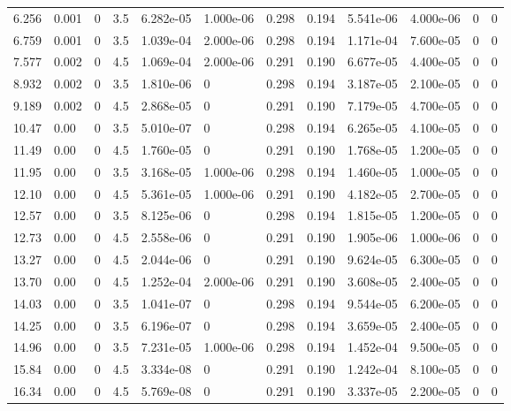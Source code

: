 \documentclass[preview]{standalone}
\begin{document}
{{\begin{tabular}{L{1.2cm}C{1.2cm} C{0.3cm}C{0.5cm} C{1.4cm}C{1.4cm} C{1.4cm}C{1.4cm} C{1.6cm}C{1.6cm} C{1.6cm}C{1.6cm}}
  6.256  &  0.001  & 0     & 3.5 &  6.282e-05  & 1.000e-06  &  0.298&   0.194& 5.541e-06 & 4.000e-06   &  0 & 0  \\ 
  6.759  &  0.001  & 0     & 3.5 &  1.039e-04  & 2.000e-06  &  0.298&   0.194& 1.171e-04 & 7.600e-05   &  0 & 0  \\ 
  7.577  &  0.002  & 0     & 4.5 &  1.069e-04  & 2.000e-06  &  0.291&   0.190& 6.677e-05 & 4.400e-05   &  0 & 0  \\ 
  8.932  &  0.002  & 0     & 3.5 &  1.810e-06  & 0  &  0.298&   0.194& 3.187e-05 & 2.100e-05   &  0 & 0  \\ 
  9.189  &  0.002  & 0     & 4.5 &  2.868e-05  & 0  &  0.291&   0.190& 7.179e-05 & 4.700e-05   &  0 & 0  \\ 
  10.47  &  0.00  & 0     & 3.5 &  5.010e-07  & 0  &  0.298&   0.194& 6.265e-05 & 4.100e-05   &  0 & 0  \\ 
  11.49  &  0.00  & 0     & 4.5 &  1.760e-05  & 0  &  0.291&   0.190& 1.768e-05 & 1.200e-05   &  0 & 0  \\ 
  11.95  &  0.00  & 0     & 3.5 &  3.168e-05  & 1.000e-06  &  0.298&   0.194& 1.460e-05 & 1.000e-05   &  0 & 0  \\ 
  12.10  &  0.00  & 0     & 4.5 &  5.361e-05  & 1.000e-06  &  0.291&   0.190& 4.182e-05 & 2.700e-05   &  0 & 0  \\ 
  12.57  &  0.00  & 0     & 3.5 &  8.125e-06  & 0  &  0.298&   0.194& 1.815e-05 & 1.200e-05   &  0 & 0  \\ 
  12.73  &  0.00  & 0     & 4.5 &  2.558e-06  & 0  &  0.291&   0.190& 1.905e-06 & 1.000e-06   &  0 & 0  \\ 
  13.27  &  0.00  & 0     & 4.5 &  2.044e-06  & 0  &  0.291&   0.190& 9.624e-05 & 6.300e-05   &  0 & 0  \\ 
  13.70  &  0.00  & 0     & 4.5 &  1.252e-04  & 2.000e-06  &  0.291&   0.190& 3.608e-05 & 2.400e-05   &  0 & 0  \\ 
  14.03  &  0.00  & 0     & 3.5 &  1.041e-07  & 0  &  0.298&   0.194& 9.544e-05 & 6.200e-05   &  0 & 0  \\ 
  14.25  &  0.00  & 0     & 3.5 &  6.196e-07  & 0  &  0.298&   0.194& 3.659e-05 & 2.400e-05   &  0 & 0  \\ 
  14.96  &  0.00  & 0     & 3.5 &  7.231e-05  & 1.000e-06  &  0.298&   0.194& 1.452e-04 & 9.500e-05   &  0 & 0  \\ 
  15.84  &  0.00  & 0     & 4.5 &  3.334e-08  & 0  &  0.291&   0.190& 1.242e-04 & 8.100e-05   &  0 & 0  \\ 
  16.34  &  0.00  & 0     & 4.5 &  5.769e-08  & 0  &  0.291&   0.190& 3.337e-05 & 2.200e-05   &  0 & 0  \\ 

\end{tabular}}}
\end{document}
